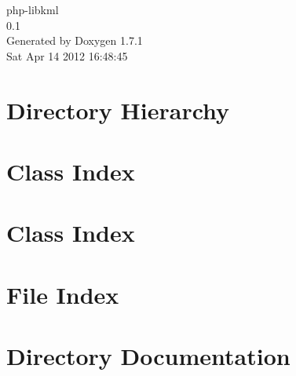 \documentclass[a4paper]{book}
\begin{document}
\hypersetup{pageanchor=false}
\begin{titlepage}
\vspace*{7cm}
\begin{center}
{\Large php-\/libkml \\[1ex]\large 0.1 }\\
\vspace*{1cm}
{\large Generated by Doxygen 1.7.1}\\
\vspace*{0.5cm}
{\small Sat Apr 14 2012 16:48:45}\\
\end{center}
\end{titlepage}
\clearemptydoublepage
{}
\tableofcontents
\clearemptydoublepage
{}
\hypersetup{pageanchor=true}
\chapter{Directory Hierarchy}

\chapter{Class Index}

\chapter{Class Index}

\chapter{File Index}

\chapter{Directory Documentation}













\end{document}
